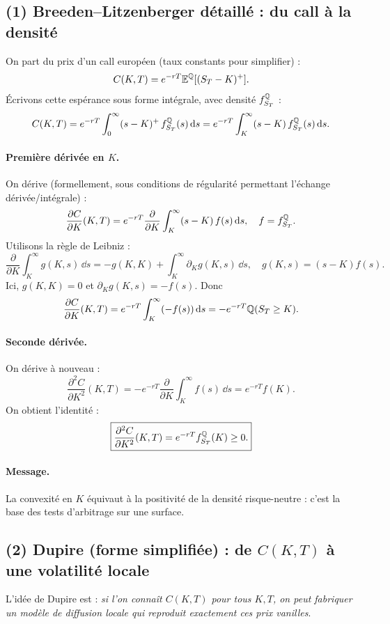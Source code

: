 
\subsection*{(1) Breeden--Litzenberger détaillé : du call à la densité}
On part du prix d'un call européen (taux constants pour simplifier) :
\[
C(K,T)=e^{-rT}\mathbb{E}^{\mathbb{Q}}[(S_T-K)^+].
\]
Écrivons cette espérance sous forme intégrale, avec densité $f_{S_T}^{\mathbb{Q}}$ :
\[
C(K,T)=e^{-rT}\int_0^{\infty}(s-K)^+\,f_{S_T}^{\mathbb{Q}}(s)\,\mathrm{d} s
=e^{-rT}\int_K^{\infty}(s-K)\,f_{S_T}^{\mathbb{Q}}(s)\,\mathrm{d} s.
\]
\paragraph{Première dérivée en $K$.}
On dérive (formellement, sous conditions de régularité permettant l'échange dérivée/intégrale) :
\[
\frac{\partial C}{\partial K}(K,T)
=e^{-rT}\frac{\partial}{\partial K}\int_K^{\infty}(s-K)\,f(s)\,\mathrm{d} s,
\quad f=f_{S_T}^{\mathbb{Q}}.
\]
Utilisons la règle de Leibniz :
\[
\frac{\partial}{\partial K}\int_K^{\infty}g(K,s)\,\dd s
=-g(K,K)+\int_K^{\infty}\partial_K g(K,s)\,\dd s,
\quad g(K,s)=(s-K)f(s).
\]
Ici, $g(K,K)=0$ et $\partial_K g(K,s)=-f(s)$. Donc
\[
\frac{\partial C}{\partial K}(K,T)
=e^{-rT}\int_K^{\infty}(-f(s))\,\mathrm{d} s
=-e^{-rT}\mathbb{Q}(S_T\ge K).
\]
\paragraph{Seconde dérivée.}
On dérive à nouveau :
\[
\frac{\partial^2 C}{\partial K^2}(K,T)
=-e^{-rT}\frac{\partial}{\partial K}\int_K^{\infty} f(s)\,\dd s
=e^{-rT}f(K).
\]
On obtient l'identité :
\[
\boxed{\frac{\partial^2 C}{\partial K^2}(K,T)=e^{-rT}f_{S_T}^{\mathbb{Q}}(K)\ge 0.}
\]
\paragraph{Message.}
La convexité en $K$ équivaut à la positivité de la densité risque-neutre : c'est la base des tests d'arbitrage sur une surface.

\subsection*{(2) Dupire (forme simplifiée) : de $C(K,T)$ à une volatilité locale}
L'idée de Dupire est : \emph{si l'on connaît $C(K,T)$ pour tous $K,T$, on peut fabriquer un modèle de diffusion locale qui reproduit exactement ces prix vanilles}.

